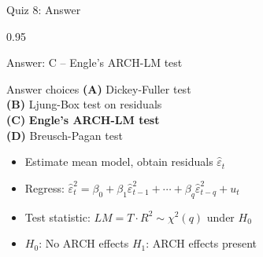 \documentclass[9pt, aspectratio=169, t]{beamer}
\begin{document}
\begin{frame}{Quiz 8: Answer}
    \begin{cminipage}{0.95\textwidth}
    \begin{exampleblock}{Answer: C -- Engle's ARCH-LM test}

    \vspace{0.1cm}

    \begin{block}{Answer choices}
        \textcolor{MainBlue}{\textbf{(A)}} Dickey-Fuller test \incorrect\\[3pt]
        \textcolor{MainBlue}{\textbf{(B)}} Ljung-Box test on residuals \incorrect\\[3pt]
        \textcolor{MainBlue}{\textbf{(C)}} \textbf{\textcolor{Forest}{Engle's ARCH-LM test}} \correct\\[3pt]
        \textcolor{MainBlue}{\textbf{(D)}} Breusch-Pagan test \incorrect
    \end{block}

        \vspace{0.1cm}

        \begin{itemize}
            \item Estimate mean model, obtain residuals $\hat{\varepsilon}_t$
            \item Regress: $\hat{\varepsilon}_t^2 = \beta_0 + \beta_1 \hat{\varepsilon}_{t-1}^2 + \cdots + \beta_q \hat{\varepsilon}_{t-q}^2 + u_t$
            \item Test statistic: $LM = T \cdot R^2 \sim \chi^2(q)$ under $H_0$
            \item $H_0$: No ARCH effects \quad $H_1$: ARCH effects present
        \end{itemize}
    \end{exampleblock}

    \end{cminipage}
\end{frame}
\end{document}

